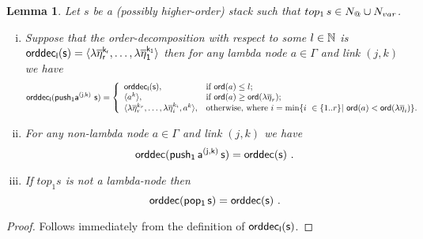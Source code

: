 \documentclass[a4paper]{article}
\newtheorem{lemma}{Lemma}[section]
\theoremstyle{remark}
\theoremstyle{definition}
\newcommand\orddec{\sf orddec}
\newcommand\sig{\sf sig}
\begin{document}
\begin{lemma}
\label{lem:push1pop1_orderdecompo} Let $s$ be a (possibly higher-order) stack
such that $top_1\,s \in N_@ \cup N_{var}$.
\begin{enumerate}[i.]
\item Suppose that the order-decomposition with respect to some $l\in\mathbb{N}$ is $\orddec_l(s) = \langle \lambda
\overline{\eta}_r^{k_r}, \ldots, \lambda \overline{\eta}_1^{k_1}
\rangle$ then for any lambda node $a \in \Gamma$ and link $(j,k)$ we have
 $$ \orddec_l(push_1 a^{(j,k)}~s) = \left\{
                                       \begin{array}{ll}
\orddec_l(s), &\hbox{if $\ord{a}\leq l$;} \\
                                        \langle a^k \rangle, &  \hbox{if $\ord{a} \geq \ord{\lambda \overline{\eta}_r}$}; \\
                                         \langle \lambda \overline{\eta}_r^{k_r}, \ldots, \lambda
\overline{\eta}_i^{k_i}, a^k \rangle, & \hbox{otherwise, where $i = \min \{ i \ \in \{1..r\}| \ \ord{a} <
\ord{\lambda \overline{\eta}_i} \}$.}
                                       \end{array}
                                     \right.$$


\item For any non-lambda node $a \in \Gamma$ and link $(j,k)$ we have
$$ \orddec(push_1\,a^{(j,k)}\,s) = \orddec(s) \ .$$

\item If $top_1 s$ is not a lambda-node then
$$ \orddec(pop_1\,s) = \orddec(s) \ .$$
\end{enumerate}
\end{lemma}
\begin{proof}
Follows immediately from the definition of  $\orddec_l(s)$.
\end{proof}
\end{document}
